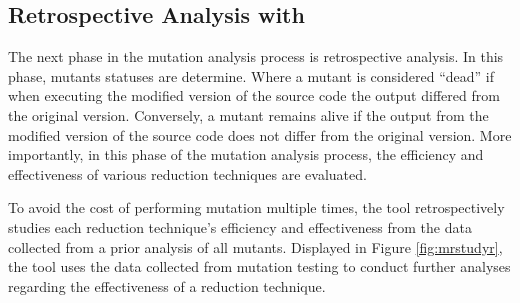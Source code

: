 \subsection{Retrospective Analysis with \mr}

The next phase in the mutation analysis process is retrospective analysis. In this
phase, mutants statuses are determine. Where a mutant is considered
``dead'' if when executing the modified version of the source
code the output differed from the original version. Conversely, a mutant remains alive
if the output from the modified version of the source code does not differ from the
original version. More importantly, in this phase of the mutation analysis process,
the efficiency and effectiveness of various reduction techniques are evaluated.

To avoid the cost of performing mutation multiple times, the \mr tool retrospectively studies
each reduction technique's efficiency and effectiveness from the data collected from a prior analysis of all mutants.
Displayed in Figure \ref{fig:mrstudyr},
the \mr tool uses the data collected from mutation testing to conduct further analyses
regarding the effectiveness of a reduction technique.
